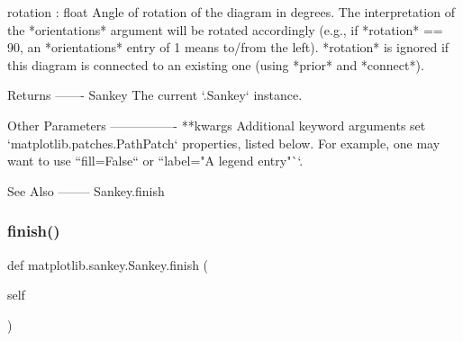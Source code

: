\begin{DoxyVerb}
rotation : float
    Angle of rotation of the diagram in degrees.  The interpretation of
    the *orientations* argument will be rotated accordingly (e.g., if
    *rotation* == 90, an *orientations* entry of 1 means to/from the
    left).  *rotation* is ignored if this diagram is connected to an
    existing one (using *prior* and *connect*).

Returns
-------
Sankey
    The current `.Sankey` instance.

Other Parameters
----------------
**kwargs
   Additional keyword arguments set `matplotlib.patches.PathPatch`
   properties, listed below.  For example, one may want to use
   ``fill=False`` or ``label="A legend entry"``.


See Also
--------
Sankey.finish
\end{DoxyVerb}
 \mbox{\label{classmatplotlib_1_1sankey_1_1Sankey_aa0c7831861b5926172ba8bedba783022}} 
\subsubsection{\texorpdfstring{finish()}{finish()}}
{\footnotesize\ttfamily def matplotlib.\+sankey.\+Sankey.\+finish (\begin{DoxyParamCaption}\item[{}]{self }\end{DoxyParamCaption})}

